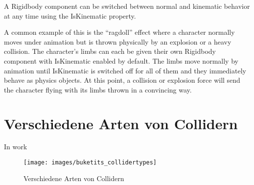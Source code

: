 A Rigidbody component can be switched between normal and kinematic behavior at any time using the IsKinematic property.

A common example of this is the “ragdoll” effect where a character normally moves under animation but is thrown physically by an explosion or a heavy collision. The character’s limbs can each be given their own Rigidbody component with IsKinematic enabled by default. The limbs move normally by animation until IsKinematic is switched off for all of them and they immediately behave as physics objects. At this point, a collision or explosion force will send the character flying with its limbs thrown in a convincing way.
\cite{_staticCollider}

\section{Verschiedene Arten von Collidern}
In work
\begin{figure}[h]
	\centering
	\texttt{[image: images/buketits\_collidertypes]}
	\caption{Verschiedene Arten von Collidern}
\end{figure}
\cite{dickinson2015unity}